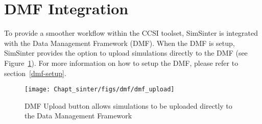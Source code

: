 \section{DMF Integration}
\label{sec.tut.simsinter.dmf}

To provide a smoother workflow within the CCSI toolset, SimSinter is integrated with the
Data Management Framework (DMF). When the DMF is setup, SimSinter
provides the option to upload simulations directly to the DMF
(see Figure~\ref{fig.sinter.dmf.upload}). For more information on how to setup the DMF,
please refer to section~\ref{dmf-setup}.


\begin{figure}[H]
  \begin{center}
    \texttt{[image: Chapt\_sinter/figs/dmf/dmf\_upload]}
    \caption{DMF Upload button allows simulations to be uploaded directly
      to the Data Management Framework}
    \label{fig.sinter.dmf.upload}
  \end{center}
\end{figure}

